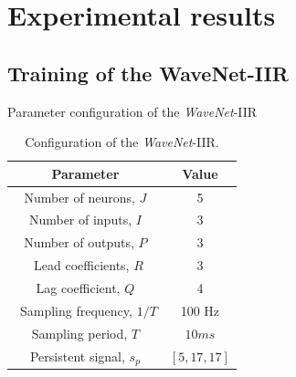 \documentclass{beamer}
\begin{document}





\section{Experimental results}

\subsection{Training of the WaveNet-IIR}


\begin{frame}{Parameter configuration of the \textit{WaveNet}-IIR}
\small{
\begin{table}[h!]
        \centering
        \caption{Configuration of the \textit{WaveNet}-IIR.}
        \label{tab:init config morlet}
        \begin{tabular}{cc}
            \hline
            \textbf{Parameter} & \textbf{Value}  \\ \hline   \hline 
           Number of neurons, $J$ & 5 \\
             Number of inputs, $I$ & 3\\
             Number of outputs, $P$  & 3\\\
             Lead coefficients, $R$ & 3\\
             Lag coefficient, $Q$  & 4 \\\
             Sampling frequency, $1/T$  & 100 Hz\\
             Sampling period, $T$&  $10ms$\\
             Persistent signal, $s_p$     & $[5, 17, 17]$\\
             \hline   \hline
        \end{tabular}
    \end{table}}
   
\end{frame}
\end{document}
